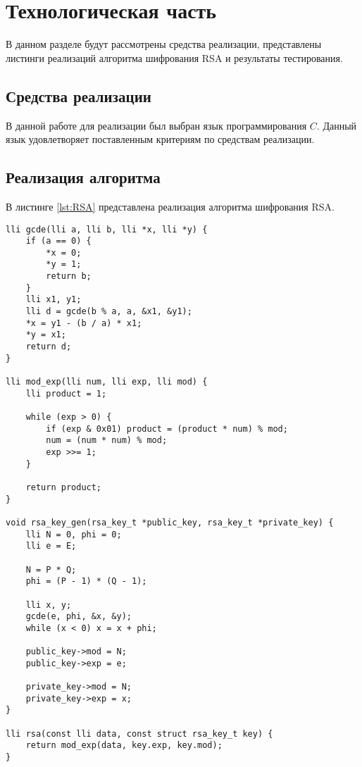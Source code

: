 \chapter{Технологическая часть}

В данном разделе будут рассмотрены средства реализации, представлены листинги реализаций алгоритма шифрования RSA и результаты тестирования.

\section{Средства реализации}

В данной работе для реализации был выбран язык программирования $C$. Данный язык удовлетворяет поставленным критериям по средствам реализации.

\section{Реализация алгоритма}

В листинге \ref{lst:RSA} представлена реализация алгоритма шифрования RSA.

\begin{center}
	\captionsetup{justification=raggedright,singlelinecheck=off}
	\begin{lstlisting}[label=lst:RSA,caption=RSA]
lli gcde(lli a, lli b, lli *x, lli *y) {
	if (a == 0) {
		*x = 0;
		*y = 1;
		return b;
	}
	lli x1, y1;
	lli d = gcde(b % a, a, &x1, &y1);
	*x = y1 - (b / a) * x1;
	*y = x1;
	return d;
}

lli mod_exp(lli num, lli exp, lli mod) {
	lli product = 1;
	
	while (exp > 0) {
		if (exp & 0x01) product = (product * num) % mod;
		num = (num * num) % mod;
		exp >>= 1;
	}
	
	return product;
}

void rsa_key_gen(rsa_key_t *public_key, rsa_key_t *private_key) {
	lli N = 0, phi = 0;
	lli e = E;
	
	N = P * Q;
	phi = (P - 1) * (Q - 1);
	
	lli x, y;
	gcde(e, phi, &x, &y);
	while (x < 0) x = x + phi;
	
	public_key->mod = N;
	public_key->exp = e;
	
	private_key->mod = N;
	private_key->exp = x;
}

lli rsa(const lli data, const struct rsa_key_t key) {
	return mod_exp(data, key.exp, key.mod);
}
	\end{lstlisting}
\end{center}

